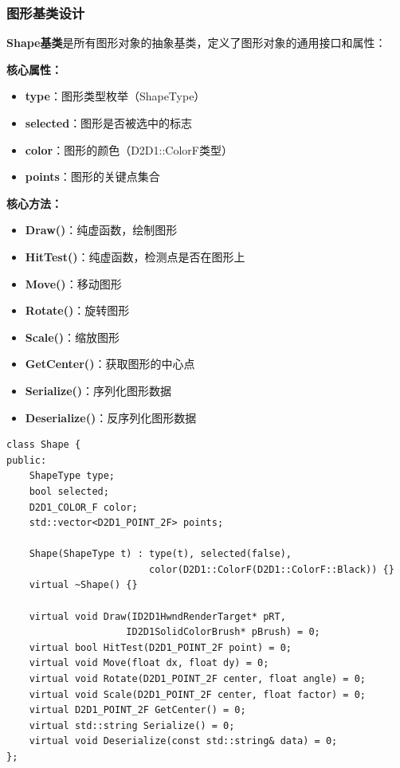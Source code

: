 \documentclass[12pt,a4paper]{article}
\begin{document}
\subsubsection{图形基类设计}

\begin{tcolorbox}
\textbf{Shape基类}是所有图形对象的抽象基类，定义了图形对象的通用接口和属性：

\textbf{核心属性：}
\begin{itemize}
    \item \textbf{type}：图形类型枚举（ShapeType）
    \item \textbf{selected}：图形是否被选中的标志
    \item \textbf{color}：图形的颜色（D2D1::ColorF类型）
    \item \textbf{points}：图形的关键点集合
\end{itemize}

\textbf{核心方法：}
\begin{itemize}
    \item \textbf{Draw()}：纯虚函数，绘制图形
    \item \textbf{HitTest()}：纯虚函数，检测点是否在图形上
    \item \textbf{Move()}：移动图形
    \item \textbf{Rotate()}：旋转图形
    \item \textbf{Scale()}：缩放图形
    \item \textbf{GetCenter()}：获取图形的中心点
    \item \textbf{Serialize()}：序列化图形数据
    \item \textbf{Deserialize()}：反序列化图形数据
\end{itemize}
\end{tcolorbox}

\begin{lstlisting}[caption=Shape基类定义]
class Shape {
public:
    ShapeType type;
    bool selected;
    D2D1_COLOR_F color;
    std::vector<D2D1_POINT_2F> points;
    
    Shape(ShapeType t) : type(t), selected(false), 
                         color(D2D1::ColorF(D2D1::ColorF::Black)) {}
    virtual ~Shape() {}
    
    virtual void Draw(ID2D1HwndRenderTarget* pRT, 
                     ID2D1SolidColorBrush* pBrush) = 0;
    virtual bool HitTest(D2D1_POINT_2F point) = 0;
    virtual void Move(float dx, float dy) = 0;
    virtual void Rotate(D2D1_POINT_2F center, float angle) = 0;
    virtual void Scale(D2D1_POINT_2F center, float factor) = 0;
    virtual D2D1_POINT_2F GetCenter() = 0;
    virtual std::string Serialize() = 0;
    virtual void Deserialize(const std::string& data) = 0;
};
\end{lstlisting}
\end{document}
